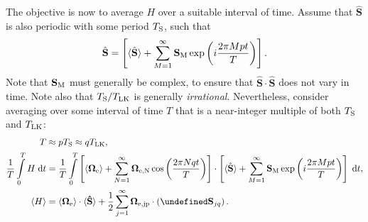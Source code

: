 \documentclass[
        fleqn,
        usenatbib,
    ]{mnras}
\newcommand*{\ev}[1]{\langle#1\rangle}
\newcommand*{\bm}[1]{\boldsymbol{\mathbf{#1}}}
\newcommand*{\uv}[1]{\hat{\bm{#1}}}
\newcommand*{\p}[1]{\left(#1\right)}
\newcommand*{\s}[1]{\left[#1\right]}
\let\Re\undefined
\DeclareMathOperator{\Re}{Re}
\begin{document}
The objective is now to average $H$ over a suitable interval of time. Assume
that $\uv{S}$ is also periodic with some period $T_{\rm S}$, such that
\begin{equation}
    \uv{S} = \s{\ev{\uv{S}} + \sum\limits_{M = 1}^\infty
            \bm{S}_{\rm M}\exp \p{i\frac{2\pi M pt}{T}}}.
\end{equation}
Note that $\bm{S}_{\rm M}$ must generally be complex, to ensure that $\uv{S}
\cdot \uv{S}$ does not vary in time. Note also that $T_{\rm S} / T_{\rm LK}$ is
generally \emph{irrational}. Nevertheless, consider averaging over some interval
of time $T$ that is a near-integer multiple of both $T_{\rm S}$ and $T_{\rm
LK}$:
\begin{align}
    T &\approx pT_{\rm S} \approx qT_{\rm LK}\label{eq:T_def},\\
    \frac{1}{T}\int\limits_0^T H\;\mathrm{d}t
        &= \frac{1}{T}\int\limits_0^T
            \s{\ev{\bm{\Omega}_{\rm e}} + \sum\limits_{N = 1}^\infty
            \bm{\Omega}_{\rm e, N}\cos \p{\frac{2\pi N qt}{T}}}
            \cdot \s{\ev{\uv{S}} + \sum\limits_{M = 1}^\infty
            \bm{S}_{\rm M}\exp \p{i\frac{2\pi M pt}{T}}}\;\mathrm{d}t,\\
    \ev{H} &= \ev{\bm{\Omega}_{\rm e}} \cdot \ev{\bm{\uv{S}}}
            + \frac{1}{2}\sum\limits_{j = 1}^\infty
                \bm{\Omega}_{\rm e, jp} \cdot \left(\Re\bm{S}_{jq}\right).
                \label{eq:exp_h}
\end{align}
\end{document}
